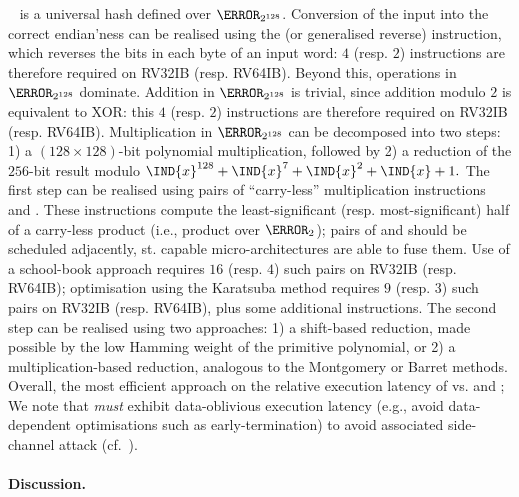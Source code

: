 ~\cite[Section 6.4]{NIST:sp.800.38d} is a universal hash defined 
over $\F_{2^{128}}$.
Conversion of the input into the correct endian'ness can be realised using
the 
 (or generalised reverse)
instruction,
which reverses the bits in each byte of an input word:
$4$ (resp. $2$) 
instructions are therefore required on RV32IB (resp. RV64IB).
Beyond this, operations in $\F_{2^{128}}$ dominate.
Addition       in $\F_{2^{128}}$ 
is trivial, since addition modulo $2$ is equivalent to XOR: this
$4$ (resp. $2$) 
instructions are therefore required on RV32IB (resp. RV64IB).
Multiplication in $\F_{2^{128}}$ 
can be decomposed into two steps:
1) a $( 128 \times 128 )$-bit polynomial multiplication, 
   followed by 
2) a reduction of the $256$-bit result modulo
   $
   \IND{x}^{128} + \IND{x}^{7} + \IND{x}^{2} + \IND{x} + 1 .
   $
The first  step 
can be realised using pairs of ``carry-less'' multiplication instructions
 and .
These instructions compute the least-significant (resp. most-significant) 
half of a carry-less product (i.e., product over $\F_2$); pairs of 
 and 
should be scheduled adjacently, st. capable micro-architectures are able 
to fuse them.
Use of a school-book approach 
requires
$16$ (resp. $4$) such pairs 
on RV32IB (resp. RV64IB);
optimisation using the Karatsuba method
requires
$ 9$ (resp. $3$) such pairs 
on RV32IB (resp. RV64IB),
plus some additional  instructions.
The second step
can be realised using two approaches:
1) a          shift-based reduction, made possible by the low Hamming weight of the primitive polynomial,
   or
2) a multiplication-based reduction, analogous to the Montgomery or Barret methods.
Overall, the most efficient approach on the relative execution latency of
vs.
 and ;
We note that 
{\em must} exhibit data-oblivious execution latency 
(e.g., avoid data-dependent optimisations such as early-termination)
to avoid associated side-channel attack (cf.~\cite{GOPT:09}).


\paragraph{Discussion.}

